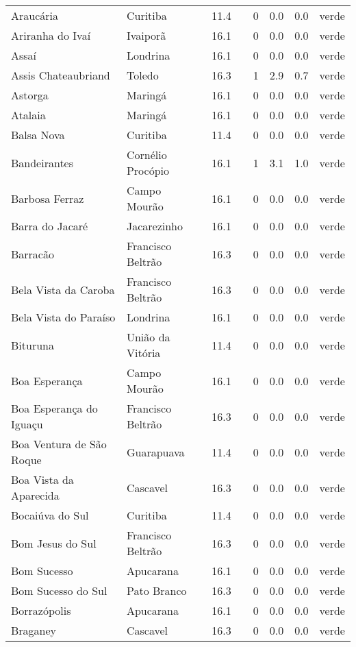 \begin{longtable}{l|lllllll}
  Araucária & Curitiba & 11.4 &  & 0 & 0.0 & 0.0 & verde \\ 
  Ariranha do Ivaí & Ivaiporã & 16.1 &  & 0 & 0.0 & 0.0 & verde \\ 
  Assaí & Londrina & 16.1 &  & 0 & 0.0 & 0.0 & verde \\ 
  Assis Chateaubriand & Toledo & 16.3 &  & 1 & 2.9 & 0.7 & verde \\ 
  Astorga & Maringá & 16.1 &  & 0 & 0.0 & 0.0 & verde \\ 
  Atalaia & Maringá & 16.1 &  & 0 & 0.0 & 0.0 & verde \\ 
  Balsa Nova & Curitiba & 11.4 &  & 0 & 0.0 & 0.0 & verde \\ 
  Bandeirantes & Cornélio Procópio & 16.1 &  & 1 & 3.1 & 1.0 & verde \\ 
  Barbosa Ferraz & Campo Mourão & 16.1 &  & 0 & 0.0 & 0.0 & verde \\ 
  Barra do Jacaré & Jacarezinho & 16.1 &  & 0 & 0.0 & 0.0 & verde \\ 
  Barracão & Francisco Beltrão & 16.3 &  & 0 & 0.0 & 0.0 & verde \\ 
  Bela Vista da Caroba & Francisco Beltrão & 16.3 &  & 0 & 0.0 & 0.0 & verde \\ 
  Bela Vista do Paraíso & Londrina & 16.1 &  & 0 & 0.0 & 0.0 & verde \\ 
  Bituruna & União da Vitória & 11.4 &  & 0 & 0.0 & 0.0 & verde \\ 
  Boa Esperança & Campo Mourão & 16.1 &  & 0 & 0.0 & 0.0 & verde \\ 
  Boa Esperança do Iguaçu & Francisco Beltrão & 16.3 &  & 0 & 0.0 & 0.0 & verde \\ 
  Boa Ventura de São Roque & Guarapuava & 11.4 &  & 0 & 0.0 & 0.0 & verde \\ 
  Boa Vista da Aparecida & Cascavel & 16.3 &  & 0 & 0.0 & 0.0 & verde \\ 
  Bocaiúva do Sul & Curitiba & 11.4 &  & 0 & 0.0 & 0.0 & verde \\ 
  Bom Jesus do Sul & Francisco Beltrão & 16.3 &  & 0 & 0.0 & 0.0 & verde \\ 
  Bom Sucesso & Apucarana & 16.1 &  & 0 & 0.0 & 0.0 & verde \\ 
  Bom Sucesso do Sul & Pato Branco & 16.3 &  & 0 & 0.0 & 0.0 & verde \\ 
  Borrazópolis & Apucarana & 16.1 &  & 0 & 0.0 & 0.0 & verde \\ 
  Braganey & Cascavel & 16.3 &  & 0 & 0.0 & 0.0 & verde \\ 

\end{longtable}

